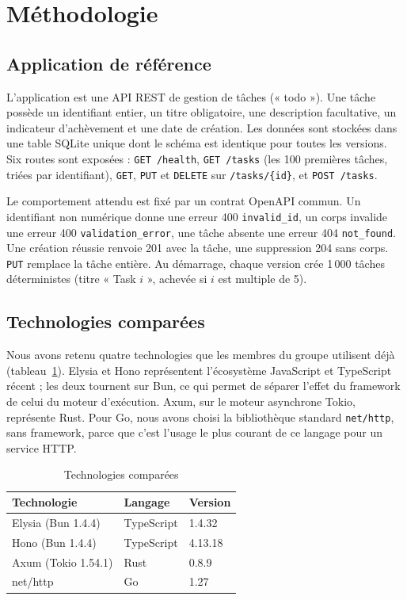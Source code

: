 \documentclass[conference,a4paper]{IEEEtran}
\begin{document}
\section{Méthodologie}
\subsection{Application de référence}
L'application est une API REST de gestion de tâches (« todo »). Une tâche
possède un identifiant entier, un titre obligatoire, une description
facultative, un indicateur d'achèvement et une date de création. Les
données sont stockées dans une table SQLite unique dont le schéma est
identique pour toutes les versions. Six routes sont exposées :
\texttt{GET /health}, \texttt{GET /tasks} (les 100 premières tâches,
triées par identifiant), \texttt{GET}, \texttt{PUT} et \texttt{DELETE}
sur \texttt{/tasks/\{id\}}, et \texttt{POST /tasks}.

Le comportement attendu est fixé par un contrat OpenAPI commun. Un
identifiant non numérique donne une erreur 400 \texttt{invalid\_id}, un
corps invalide une erreur 400 \texttt{validation\_error}, une tâche
absente une erreur 404 \texttt{not\_found}. Une création réussie renvoie
201 avec la tâche, une suppression 204 sans corps. \texttt{PUT} remplace
la tâche entière. Au démarrage, chaque version crée 1\,000 tâches
déterministes (titre « Task $i$ », achevée si $i$ est multiple de 5).

\subsection{Technologies comparées}
Nous avons retenu quatre technologies que les membres du groupe
utilisent déjà (tableau~\ref{tab:techno}). Elysia et Hono représentent
l'écosystème JavaScript et TypeScript récent ; les deux tournent sur Bun,
ce qui permet de séparer l'effet du framework de celui du moteur
d'exécution. Axum, sur le moteur asynchrone Tokio, représente Rust. Pour
Go, nous avons choisi la bibliothèque standard \texttt{net/http}, sans
framework, parce que c'est l'usage le plus courant de ce langage pour un
service HTTP.

\begin{table}[htbp]
\caption{Technologies comparées}
\label{tab:techno}
\centering
\begin{tabular}{@{}lll@{}}
\toprule
\textbf{Technologie} & \textbf{Langage} & \textbf{Version} \\
\midrule
Elysia (Bun 1.4.4) & TypeScript & 1.4.32 \\
Hono (Bun 1.4.4) & TypeScript & 4.13.18 \\
Axum (Tokio 1.54.1) & Rust & 0.8.9 \\
net/http & Go & 1.27 \\
\bottomrule
\end{tabular}
\end{table}
\end{document}
